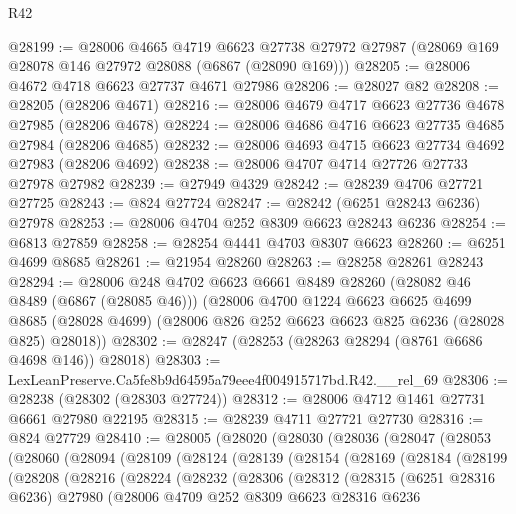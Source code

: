 \begin{lexlean}{R42}
\begin{coremodule}
{@28199 := @28006
    @4665
    @4719
    @6623
    @27738
    @27972
    @27987
    (@28069 @169 @28078 @146 @27972 @28088 (@6867 (@28090 @169)))
@28205 := @28006 @4672 @4718 @6623 @27737 @4671 @27986
@28206 := @28027 @82
@28208 := @28205 (@28206 @4671)
@28216 := @28006 @4679 @4717 @6623 @27736 @4678 @27985 (@28206 @4678)
@28224 := @28006 @4686 @4716 @6623 @27735 @4685 @27984 (@28206 @4685)
@28232 := @28006 @4693 @4715 @6623 @27734 @4692 @27983 (@28206 @4692)
@28238 := @28006 @4707 @4714 @27726 @27733 @27978 @27982
@28239 := @27949 @4329
@28242 := @28239 @4706 @27721 @27725
@28243 := @824 @27724
@28247 := @28242 (@6251 @28243 @6236) @27978
@28253 := @28006 @4704 @252 @8309 @6623 @28243 @6236
@28254 := @6813 @27859
@28258 := @28254 @4441 @4703 @8307 @6623
@28260 := @6251 @4699 @8685
@28261 := @21954 @28260
@28263 := @28258 @28261 @28243
@28294 := @28006
    @248
    @4702
    @6623
    @6661
    @8489
    @28260
    (@28082 @46 @8489 (@6867 (@28085 @46)))
    (@28006
      @4700
      @1224
      @6623
      @6625
      @4699
      @8685
      (@28028 @4699)
      (@28006 @826 @252 @6623 @6623 @825 @6236 (@28028 @825) @28018))
@28302 := @28247 (@28253 (@28263 @28294 (@8761 @6686 @4698 @146)) @28018)
@28303 := LexLeanPreserve.Ca5fe8b9d64595a79eee4f004915717bd.R42.__rel_69
@28306 := @28238 (@28302 (@28303 @27724))
@28312 := @28006 @4712 @1461 @27731 @6661 @27980 @22195
@28315 := @28239 @4711 @27721 @27730
@28316 := @824 @27729
@28410 := @28005
    (@28020
      (@28030
        (@28036
          (@28047
            (@28053
              (@28060
                (@28094
                  (@28109
                    (@28124
                      (@28139
                        (@28154
                          (@28169
                            (@28184
                              (@28199
                                (@28208
                                  (@28216
                                    (@28224
                                      (@28232
                                        (@28306
                                          (@28312
                                            (@28315
                                              (@6251 @28316 @6236)
                                              @27980
                                              (@28006
                                                @4709
                                                @252
                                                @8309
                                                @6623
                                                @28316
                                                @6236
}
\end{coremodule}
\end{lexlean}
